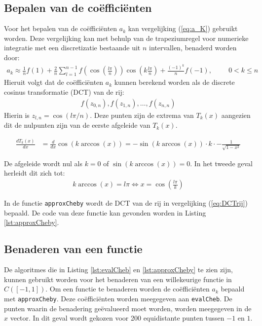 \documentclass[a4paper, 12pt, titlepage, fleqn]{article}
\begin{document}
\subsection{Bepalen van de co\"effici\"enten}
Voor het bepalen van de co\"effici\"enten $a_k$ kan vergelijking (\ref{eq:a_K}) gebruikt worden. Deze vergelijking kan met behulp van de trapeziumregel voor numerieke integratie met een discretizatie bestaande uit $n$ intervallen, benaderd worden door:
\begin{align*}
a_k \approx \frac{1}{n}f(1) + \frac{2}{n}\sum_{l=1}^{n-1}f\left(\cos\left(\frac{l\pi}{n}\right)\right)\cos\left(k\frac{l\pi}{n}\right) + \frac{(-1)^k}{n}f(-1), \hspace{1cm} 0 < k \leq n
\end{align*}
Hieruit volgt dat de co\"effici\"enten $a_k$ kunnen berekend worden als de discrete cosinus transformatie (DCT) van de rij:
\begin{align}
f(z_{0,n}),f(z_{1,n}), \ldots, f(z_{n,n})
\label{eq:DCTrij}
\end{align} 
Hierin is $z_{l,n} = \cos(l\pi/n)$. Deze punten zijn de extrema van $T_k(x)$ aangezien dit de nulpunten zijn van de eerste afgeleide van $T_k(x)$.

\begin{align*}
\frac{dT_k(x)}{dx} &= \frac{d}{dx}\cos(k\arccos(x)) = -\sin(k \arccos(x))\cdot k \cdot - \frac{1}{\sqrt{1-x^2}}
\end{align*}

De afgeleide wordt nul als $k=0$ of $\sin(k \arccos(x)) = 0$. In het tweede geval herleidt dit zich tot:
\begin{align*}
k\arccos(x) = l\pi \Leftrightarrow x = \cos\left(\frac{l\pi}{k}\right)
\end{align*}

In de functie \texttt{approxCheby} wordt de DCT van de rij in vergelijking (\ref{eq:DCTrij}) bepaald. De code van deze functie kan gevonden worden in Listing \ref{lst:approxCheby}.



\subsection{Benaderen van een functie}
De algoritmes die in Listing \ref{lst:evalCheb} en \ref{lst:approxCheby} te zien zijn, kunnen gebruikt worden voor het benaderen van een willekeurige functie in $C([-1,1])$. Om een functie te benaderen worden de co\"effici\"enten $a_k$ bepaald met \texttt{approxCheby}. Deze co\"effici\"enten worden meegegeven aan \texttt{evalCheb}. De punten waarin de benadering ge\"evalueerd moet worden, worden meegegeven in de $x$ vector. In dit geval wordt gekozen voor 200 equidistante punten tussen $-1$ en $1$.
\end{document}
